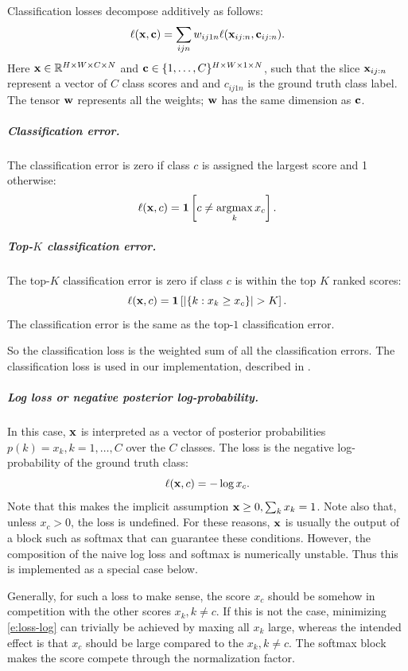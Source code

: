 Classification losses decompose additively as follows:
\begin{equation}\label{e:addloss}
\ell(\mathbf{x},\mathbf{c}) = \sum_{ijn} w_{ij1n} \ell(\mathbf{x}_{ij:n}, \mathbf{c}_{ij:n}).
\end{equation}
Here $\mathbf{x} \in \mathbb{R}^{H \times W \times C \times N}$ and $\mathbf{c} \in \{1, \dots, C\}^{H \times W \times 1 \times N}$, such that the slice $\mathbf{x}_{ij:n}$ represent a vector of $C$ class scores and and $c_{ij1n}$ is the ground truth class label. The tensor $\mathbf{w}$ represents all the weights; $\mathbf{w}$ has the same dimension as $\mathbf{c}$.

\subparagraph{Classification error.} The classification error is zero if class $c$ is assigned the largest score and 1 otherwise:
\begin{equation}\label{e:loss-classerror}
\ell(\bx,c) = \mathbf{1}\left[c \not= \argmax_k x_c\right].
\end{equation}

\subparagraph{Top-$K$ classification error.} The top-$K$ classification error is zero if class $c$ is within the top $K$ ranked scores:
\begin{equation}\label{e:loss-classerrorTopK}
\ell(\mathbf{x},c) = \mathbf{1}\left[ |\{k : x_k \geq x_c \}| > K \right].
\end{equation}
The classification error is the same as the top-$1$ classification error.

So the classification loss is the weighted sum of all the classification errors. 
The classification loss is used in our implementation, described in .


\subparagraph{Log loss or negative posterior log-probability.} In this case, $\mathbf{x}$ is interpreted as a vector of posterior probabilities $p(k) = x_k, k=1,\dots, C$ over the $C$ classes. The loss is the negative log-probability of the ground truth class:
\begin{equation}\label{e:loss-log}
\ell(\mathbf{x}, c) = - \log x_c.
\end{equation}
Note that this makes the implicit assumption $\mathbf{x} \geq 0, \sum_k x_k = 1$. Note also that, unless $x_c > 0$, the loss is undefined. For these reasons, $\mathbf{x}$ is usually the output of a block such as softmax that can guarantee these conditions. However, the composition of the naive log loss and softmax is numerically unstable. Thus this is implemented as a special case below.

Generally, for such a loss to make sense, the score $x_c$ should be somehow in competition with the other scores $x_k, k\not = c$. If this is not the case, minimizing \eqref{e:loss-log} can trivially be achieved by maxing all $x_k$ large, whereas the intended effect is that $x_c$ should be large compared to the $x_k, k\not=c$. The softmax block makes the score compete through the normalization factor.


